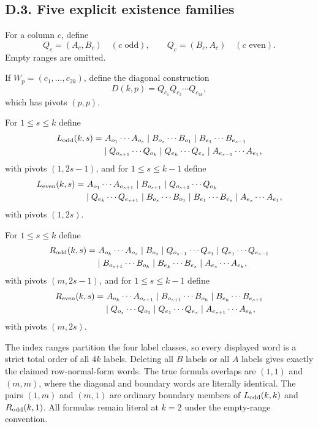 \documentclass[11pt]{article}
\theoremstyle{definition}
\theoremstyle{remark}
\begin{document}
\subsection{D.3. Five explicit existence
families}\label{d.3.-five-explicit-existence-families}

For a column \(c\), define \[
Q_c=(A_c,B_c)\quad(c\text{ odd}),\qquad
Q_c=(B_c,A_c)\quad(c\text{ even}).
\] Empty ranges are omitted.

If \(W_p=(c_1,\ldots,c_{2k})\), define the diagonal construction \[
D(k,p)=Q_{c_1}Q_{c_2}\cdots Q_{c_{2k}},
\] which has pivots \((p,p)\).

For \(1\le s\le k\) define \[
\begin{aligned}
L_{\rm odd}(k,s)=&\ A_{o_1}\cdots A_{o_s}\mid B_{o_s}\cdots B_{o_1}\mid B_{e_1}\cdots B_{e_{s-1}}\\
&\mid Q_{o_{s+1}}\cdots Q_{o_k}\mid Q_{e_k}\cdots Q_{e_s}\mid A_{e_{s-1}}\cdots A_{e_1},
\end{aligned}
\] with pivots \((1,2s-1)\), and for \(1\le s\le k-1\) define \[
\begin{aligned}
L_{\rm even}(k,s)=&\ A_{o_1}\cdots A_{o_{s+1}}\mid B_{o_{s+1}}\mid Q_{o_{s+2}}\cdots Q_{o_k}\\
&\mid Q_{e_k}\cdots Q_{e_{s+1}}\mid B_{o_s}\cdots B_{o_1}\mid B_{e_1}\cdots B_{e_s}\mid A_{e_s}\cdots A_{e_1},
\end{aligned}
\] with pivots \((1,2s)\).

For \(1\le s\le k\) define \[
\begin{aligned}
R_{\rm odd}(k,s)=&\ A_{o_k}\cdots A_{o_s}\mid B_{o_s}\mid Q_{o_{s-1}}\cdots Q_{o_1}\mid Q_{e_1}\cdots Q_{e_{s-1}}\\
&\mid B_{o_{s+1}}\cdots B_{o_k}\mid B_{e_k}\cdots B_{e_s}\mid A_{e_s}\cdots A_{e_k},
\end{aligned}
\] with pivots \((m,2s-1)\), and for \(1\le s\le k-1\) define \[
\begin{aligned}
R_{\rm even}(k,s)=&\ A_{o_k}\cdots A_{o_{s+1}}\mid B_{o_{s+1}}\cdots B_{o_k}\mid B_{e_k}\cdots B_{e_{s+1}}\\
&\mid Q_{o_s}\cdots Q_{o_1}\mid Q_{e_1}\cdots Q_{e_s}\mid A_{e_{s+1}}\cdots A_{e_k},
\end{aligned}
\] with pivots \((m,2s)\).

The index ranges partition the four label classes, so every displayed
word is a strict total order of all \(4k\) labels. Deleting all \(B\)
labels or all \(A\) labels gives exactly the claimed row-normal-form
words. The true formula overlaps are \((1,1)\) and \((m,m)\), where the
diagonal and boundary words are literally identical. The pairs \((1,m)\)
and \((m,1)\) are ordinary boundary members of \(L_{\rm odd}(k,k)\) and
\(R_{\rm odd}(k,1)\). All formulas remain literal at \(k=2\) under the
empty-range convention.
\end{document}
